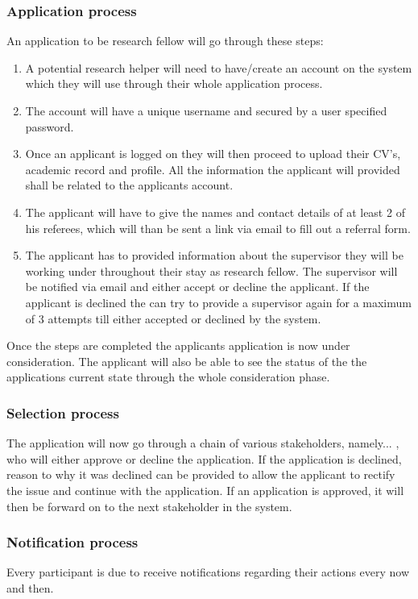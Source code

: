 \documentclass[12pt]{article}
\begin{document}
		\subsubsection{Application process}
		An application to be research fellow will go through these steps:
		\begin{enumerate}
			\item A potential research helper will need to have/create an account on the system which they will use through their whole application process. 
			\item The account will have a unique username and secured by a user specified password.
			\item Once an applicant is logged on they will then proceed to upload their CV's, academic record and profile. All the information the applicant will provided shall be related to the applicants account. 
			\item The applicant will have to give the names and contact details of at least 2 of his referees, which will than be sent a link via email to fill out a referral form. 
			\item The applicant has to provided information about the supervisor they will be working under throughout their stay as research fellow. The supervisor will be notified via email and either accept or decline the applicant. If the applicant is declined the can try to provide a supervisor again for a maximum of 3 attempts till either accepted or declined by the system.
		\end{enumerate}
		Once the steps are completed the applicants application is now under consideration. The applicant will also be able to see the status of the the applications current state through the whole consideration phase.
		\subsubsection{Selection process}
		The application will now go through a chain of various stakeholders, namely... , who will either approve or decline the application. If the application is declined, reason to why it was declined can be provided to allow the applicant to rectify the issue and continue with the application. If an application is approved, it will then be forward on to the next stakeholder in the system.
		\subsubsection{Notification process}
		Every participant is due to receive notifications regarding their actions every now and then.
\end{document}
